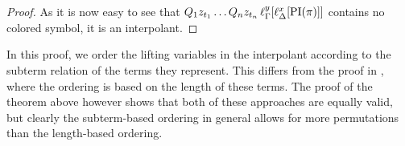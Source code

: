\begin{proof}
	As it is now easy to see that $Q_1 z_{t_1} \dots Q_n z_{t_n}\,\ell_{\Gamma}^{y}[\ell_{\Delta}^{x}[\operatorname{PI}(\pi)]]$ contains no colored symbol, it is an interpolant.
\end{proof}


\begin{remark}
	In this proof, we order the lifting variables in the interpolant according to the subterm relation of the terms they represent.
	This differs from the proof in \cite{Huang95}, where the ordering is based on the length of these terms.
	The proof of the theorem above however shows that both of these approaches are equally valid, but clearly the subterm-based ordering in general allows for more permutations than the length-based ordering. 
\end{remark}



